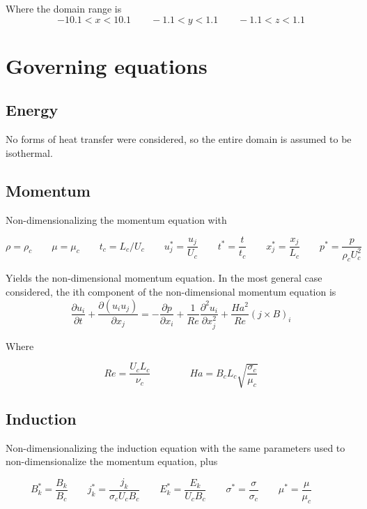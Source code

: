 \documentclass[11pt]{article}
\begin{document}
Where the domain range is
\begin{equation}
	-10.1 < x < 10.1 \qquad -1.1 < y < 1.1 \qquad -1.1 < z < 1.1
\end{equation}

\section{Governing equations}

\subsection{Energy}
No forms of heat transfer were considered, so the entire domain is assumed to be isothermal.

\subsection{Momentum}
Non-dimensionalizing the momentum equation with

\begin{equation}
	\rho = \rho_c \qquad
	\mu = \mu_c \qquad
	t_c = L_c/U_c \qquad
	u_j^* = \frac{u_j}{U_c} \qquad
	t^* = \frac{t}{t_c} \qquad
	x_j^* = \frac{x_j}{L_c} \qquad
	p^* = \frac{p}{\rho_c U_c^2} \qquad
\end{equation}

Yields the non-dimensional momentum equation. In the most general case considered, the ith component of the non-dimensional momentum equation is
\begin{equation}
	\frac{\partial u_i}{\partial t} + 
	\frac{\partial (u_i u_j)}{\partial x_j}
	= 
	- \frac{\partial p}{\partial x_i}
	+ \frac{1}{Re}
	\frac{\partial^2 u_i}{\partial x_j^2}
	+ \frac{Ha^2}{Re}
	(j \times B)_i
\end{equation}

Where

\begin{equation}
	Re = \frac{U_c L_c}{\nu_c}
	\qquad \qquad
	Ha = B_c L_c \sqrt{\frac{\sigma_c}{\mu_c}}
\end{equation}

\subsection{Induction}
Non-dimensionalizing the induction equation with the same parameters used to non-dimensionalize the momentum equation, plus

\begin{equation}
	B_k^* = \frac{B_k}{B_c}  \qquad
	j_k^* = \frac{j_k}{\sigma_c U_c B_c} \qquad
	E_k^* = \frac{E_k}{U_c B_c} \qquad
	\sigma^* = \frac{\sigma}{\sigma_c} \qquad
	\mu^* = \frac{\mu}{\mu_c} \qquad
\end{equation}
\end{document}
